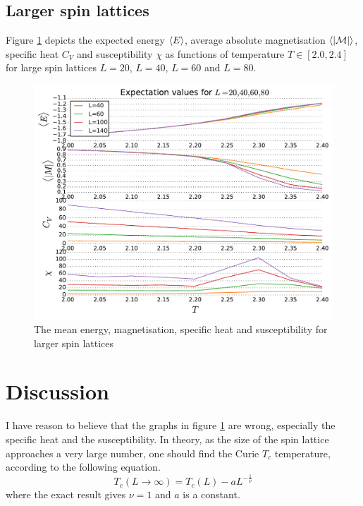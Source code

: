 \documentclass[10pt,a4paper]{amsart}
\begin{document}
\subsection{Larger spin lattices}

Figure \ref{fig:largersystems} depicts the expected energy $\ev{E}$, average absolute magnetisation $\ev{\abs{\mathcal{M}}}$, specific heat $C_V$ and susceptibility $\chi$ as functions of temperature $T \in [2.0,2.4]$ for large spin lattices $L=20$, $L=40$, $L=60$ and $L=80$.  

\begin{figure}
	\centering
	\includegraphics[width=\textwidth]{../figures/largersystems.pdf}
	\caption{The mean energy, magnetisation, specific heat and susceptibility for larger spin lattices \label{fig:largersystems}}
\end{figure}

\section{Discussion}
I have reason to believe that the graphs in figure \ref{fig:largersystems} are wrong, especially the specific heat and the susceptibility. In theory, as the size of the spin lattice approaches a very large number, one should find the Curie $T_c$ temperature, according to the following equation.
\begin{equation}
\label{eq:curie}
T_c(L\to\infty) = T_c(L)-aL^{-\frac{1}{\nu}}
\end{equation}
where the exact result gives $\nu = 1$ and $a$ is a constant.
\end{document}
